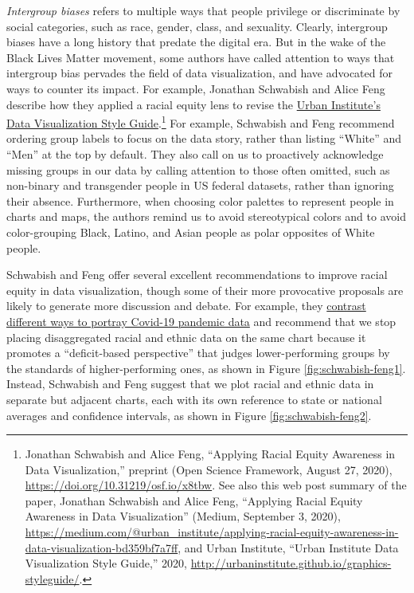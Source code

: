 \documentclass[
  english,
]{book}
\begin{document}
\emph{Intergroup biases} refers to multiple ways that people privilege or discriminate by social categories, such as race, gender, class, and sexuality. Clearly, intergroup biases have a long history that predate the digital era. But in the wake of the Black Lives Matter movement, some authors have called attention to ways that intergroup bias pervades the field of data visualization, and have advocated for ways to counter its impact. For example, Jonathan Schwabish and Alice Feng describe how they applied a racial equity lens to revise the \href{https://urbaninstitute.github.io/graphics-styleguide/}{Urban Institute's Data Visualization Style Guide}.\footnote{Jonathan Schwabish and Alice Feng, {``Applying {Racial Equity Awareness} in {Data Visualization},''} preprint ({Open Science Framework}, August 27, 2020), \url{https://doi.org/10.31219/osf.io/x8tbw}. See also this web post summary of the paper, Jonathan Schwabish and Alice Feng, {``Applying {Racial Equity Awareness} in {Data Visualization}''} ({Medium}, September 3, 2020), \url{https://medium.com/@urban_institute/applying-racial-equity-awareness-in-data-visualization-bd359bf7a7ff}, and Urban Institute, {``Urban {Institute Data Visualization Style Guide},''} 2020, \url{http://urbaninstitute.github.io/graphics-styleguide/}.} For example, Schwabish and Feng recommend ordering group labels to focus on the data story, rather than listing ``White'' and ``Men'' at the top by default. They also call on us to proactively acknowledge missing groups in our data by calling attention to those often omitted, such as non-binary and transgender people in US federal datasets, rather than ignoring their absence. Furthermore, when choosing color palettes to represent people in charts and maps, the authors remind us to avoid stereotypical colors and to avoid color-grouping Black, Latino, and Asian people as polar opposites of White people.

Schwabish and Feng offer several excellent recommendations to improve racial equity in data visualization, though some of their more provocative proposals are likely to generate more discussion and debate. For example, they \href{https://medium.com/@urban_institute/applying-racial-equity-awareness-in-data-visualization-bd359bf7a7ff}{contrast different ways to portray Covid-19 pandemic data} and recommend that we stop placing disaggregated racial and ethnic data on the same chart because it promotes a ``deficit-based perspective'' that judges lower-performing groups by the standards of higher-performing ones, as shown in Figure \ref{fig:schwabish-feng1}. Instead, Schwabish and Feng suggest that we plot racial and ethnic data in separate but adjacent charts, each with its own reference to state or national averages and confidence intervals, as shown in Figure \ref{fig:schwabish-feng2}.
\end{document}
